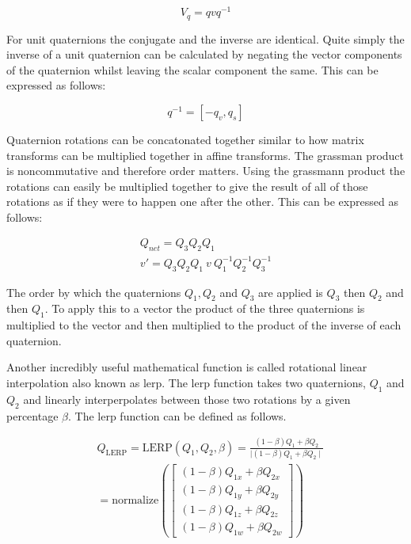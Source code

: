 \begin{equation}
	V_q = qvq^{-1}
\end{equation}

\noindent
For unit quaternions the conjugate and the inverse are identical. Quite simply the inverse of a unit quaternion can be calculated by negating the vector components of the quaternion whilst leaving the scalar component the same. This can be expressed as follows:

\begin{equation}
	q^{-1} = [-q_v, q_s]
\end{equation}

\noindent
Quaternion rotations can be concatonated together similar to how matrix transforms can be multiplied together in affine transforms. The grassman product is noncommutative and therefore order matters. Using the grassmann product the rotations can easily be multiplied together to give the result of all of those rotations as if they were to happen one after the other. This can be expressed as follows:

\begin{equation}
\begin{aligned}
Q_{net} = Q_3 Q_2 Q_1\\
v' = Q_3 Q_2 Q_1~ v~ Q_{1}^{-1} Q_{2}^{-1} Q_{3}^{-1}
\end{aligned}
\end{equation}

\noindent
The order by which the quaternions $Q_1, Q_2$ and $Q_3$ are applied is $Q_3$ then $Q_2$ and then $Q_1$. To apply this to a vector the product of the three quaternions is multiplied to the vector and then multiplied to the product of the inverse of each quaternion. 

Another incredibly useful mathematical function is called rotational linear interpolation also known as \acrshort{lerp}. The \acrshort{lerp} function takes two quaternions, $Q_1$ and $Q_2$ and linearly interperpolates between those two rotations by a given percentage  $\beta$. The \acrshort{lerp} function can be defined as follows.

\begin{equation}
\begin{aligned}
& Q_{\text{LERP}} = \text{LERP}(Q_1, Q_2, \beta) = \frac{(1-\beta)Q_1 + \beta Q_2}{\mid(1-\beta)Q_1 + \beta Q_2\mid} \\
& = \text{normalize} \left(\begin{bmatrix}
(1 - \beta) Q_{1x} + \beta Q_{2x}\\
(1 - \beta) Q_{1y} + \beta Q_{2y}\\
(1 - \beta) Q_{1z} + \beta Q_{2z}\\
(1 - \beta) Q_{1w} + \beta Q_{2w}					
\end{bmatrix}\right)
\end{aligned}
\end{equation}

